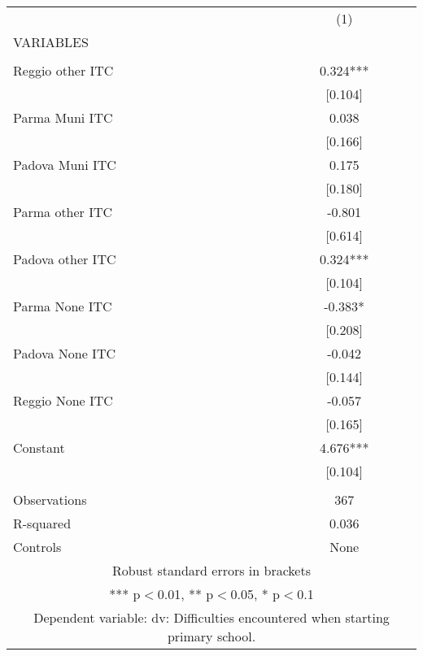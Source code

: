 \begin{tabular}{lc} \hline
 & (1) \\
VARIABLES &  \\ \hline
 &  \\
Reggio other ITC & 0.324*** \\
 & [0.104] \\
Parma Muni ITC & 0.038 \\
 & [0.166] \\
Padova Muni ITC & 0.175 \\
 & [0.180] \\
Parma other ITC & -0.801 \\
 & [0.614] \\
Padova other ITC & 0.324*** \\
 & [0.104] \\
Parma None ITC & -0.383* \\
 & [0.208] \\
Padova None ITC & -0.042 \\
 & [0.144] \\
Reggio None ITC & -0.057 \\
 & [0.165] \\
Constant & 4.676*** \\
 & [0.104] \\
 &  \\
Observations & 367 \\
R-squared & 0.036 \\
 Controls & None \\ \hline
\multicolumn{2}{c}{ Robust standard errors in brackets} \\
\multicolumn{2}{c}{ *** p$<$0.01, ** p$<$0.05, * p$<$0.1} \\
\multicolumn{2}{c}{ Dependent variable: dv: Difficulties encountered when starting primary school.} \\
\end{tabular}
